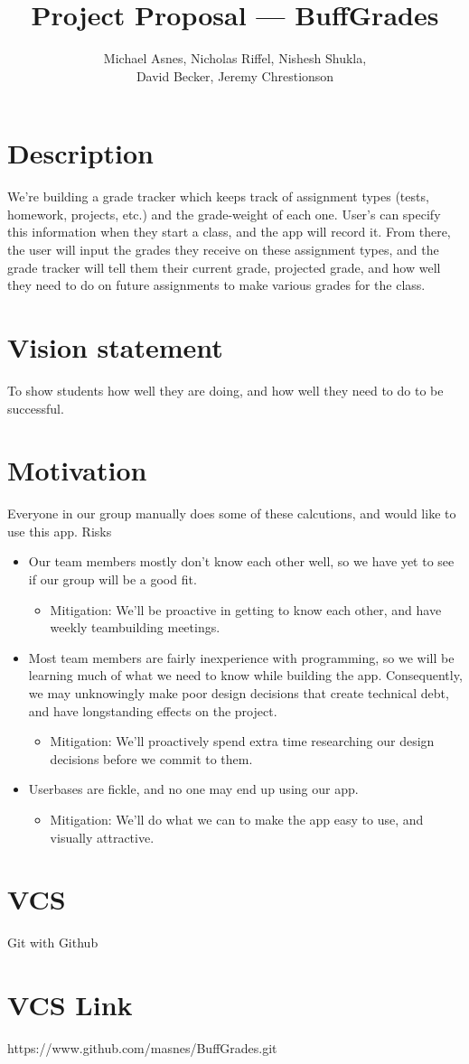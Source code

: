 \documentclass{article}
\begin{document}
\title{Project Proposal --- BuffGrades}
\author{Michael Asnes, Nicholas Riffel, Nishesh Shukla, \\ David Becker, Jeremy Chrestionson}

\maketitle
\section{Description}
We're building a grade tracker which keeps track of assignment types (tests, homework, projects, etc.) and the grade-weight of each one. User's can specify this information when they start a class, and the app will record it. From there, the user will input the grades they receive on these assignment types, and the grade tracker will tell them their current grade, projected grade, and how well they need to do on future assignments to make various grades for the class.
\section{Vision statement}
To show students how well they are doing, and how well they need to do to be successful.
\section{Motivation} 
Everyone in our group manually does some of these calcutions, and would like to use this app.
{Risks}
\begin{itemize}
  \item Our team members mostly don't know each other well, so we have yet to see if our group will be a good fit.
    \begin{itemize}
      \item Mitigation: We'll be proactive in getting to know each other, and have weekly teambuilding meetings.
    \end{itemize}
  \item Most team members are fairly inexperience with programming, so we will be learning much of what we need to know while building the app. Consequently, we may unknowingly make poor design decisions that create technical debt, and have longstanding effects on the project.
    \begin{itemize}
      \item Mitigation: We'll proactively spend extra time researching our design decisions before we commit to them.
    \end{itemize}
  \item Userbases are fickle, and no one may end up using our app.
    \begin{itemize}
      \item Mitigation: We'll do what we can to make the app easy to use, and visually attractive.
    \end{itemize}
\end{itemize}
\section{VCS}
Git with Github
\section{VCS Link}
https://www.github.com/masnes/BuffGrades.git
\end{document}
